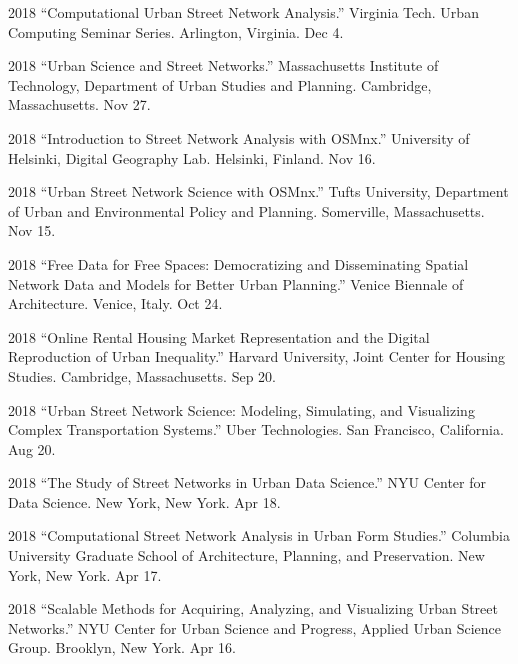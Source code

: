 \documentclass[11pt,letterpaper]{report}
\begin{document}
\begin{tablist}
        \item[2018] \tab{}\enquote{Computational Urban Street Network Analysis.} Virginia Tech. Urban Computing Seminar Series. Arlington, Virginia. Dec 4.

        \item[2018] \tab{}\enquote{Urban Science and Street Networks.} Massachusetts Institute of Technology, Department of Urban Studies and Planning. Cambridge, Massachusetts. Nov 27.

        \item[2018] \tab{}\enquote{Introduction to Street Network Analysis with OSMnx.} University of Helsinki, Digital Geography Lab. Helsinki, Finland. Nov 16.

        \item[2018] \tab{}\enquote{Urban Street Network Science with OSMnx.} Tufts University, Department of Urban and Environmental Policy and Planning. Somerville, Massachusetts. Nov 15.

        \item[2018] \tab{}\enquote{Free Data for Free Spaces: Democratizing and Disseminating Spatial Network Data and Models for Better Urban Planning.} Venice Biennale of Architecture. Venice, Italy. Oct 24.

        \item[2018] \tab{}\enquote{Online Rental Housing Market Representation and the Digital Reproduction of Urban Inequality.} Harvard University, Joint Center for Housing Studies. Cambridge, Massachusetts. Sep 20.

        \item[2018] \tab{}\enquote{Urban Street Network Science: Modeling, Simulating, and Visualizing Complex Transportation Systems.} Uber Technologies. San Francisco, California. Aug 20.

        \item[2018] \tab{}\enquote{The Study of Street Networks in Urban Data Science.} NYU Center for Data Science. New York, New York. Apr 18.

        \item[2018] \tab{}\enquote{Computational Street Network Analysis in Urban Form Studies.} Columbia University Graduate School of Architecture, Planning, and Preservation. New York, New York. Apr 17.

        \item[2018] \tab{}\enquote{Scalable Methods for Acquiring, Analyzing, and Visualizing Urban Street Networks.} NYU Center for Urban Science and Progress, Applied Urban Science Group. Brooklyn, New York. Apr 16.


\end{tablist}
\end{document}
